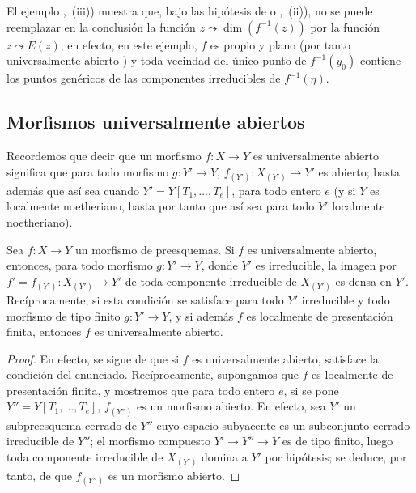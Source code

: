 \begin{remark}[14.2.7]
\label{IV.14.2.7}
El ejemplo ,~(iii)) muestra que, bajo las hipótesis de  o ,~(ii)), no se puede reemplazar en la conclusión la función $z\leadsto\dim(f^{-1}(z))$ por la función $z\leadsto E(z)$; en efecto, en este ejemplo, $f$ es propio y plano (por tanto universalmente abierto ) y toda vecindad del único punto de $f^{-1}(y_0)$ contiene los puntos genéricos de las componentes irreducibles de $f^{-1}(\eta)$.
\end{remark}


\subsection{Morfismos universalmente abiertos}
\label{subsection:IV.14.3}
\label{IV.14.3}

\begin{env}[14.3.1]
\label{IV.14.3.1}
Recordemos  que decir que un morfismo $f:X\to Y$ es universalmente abierto significa que para todo morfismo $g:Y'\to Y$, $f_{(Y')}:X_{(Y')}\to Y'$ es abierto; basta además que así sea cuando $Y'=Y[T_1,\ldots,T_e]$, para todo entero $e$  (y si $Y$ es localmente noetheriano, basta por tanto que así sea para todo $Y'$ localmente noetheriano).
\end{env}

\begin{proposition}[14.3.2]
\label{IV.14.3.2}
Sea $f:X\to Y$ un morfismo de preesquemas.
Si $f$ es universalmente abierto, entonces, para todo morfismo $g:Y'\to Y$, donde $Y'$ es irreducible, la imagen por $f'=f_{(Y')}:X_{(Y')}\to Y'$ de toda componente irreducible de $X_{(Y')}$ es densa en $Y'$.
Recíprocamente, si esta condición se satisface para todo $Y'$ irreducible y todo morfismo de tipo finito $g:Y'\to Y$, y si además $f$ es localmente de presentación finita, entonces $f$ es universalmente abierto.
\end{proposition}

\begin{proof}
En efecto, se sigue de  que si $f$ es universalmente abierto, satisface la condición del enunciado.
Recíprocamente, supongamos que $f$ es localmente de presentación finita, y mostremos que para todo entero $e$, si se pone $Y''=Y[T_1,\ldots,T_e]$, $f_{(Y'')}$ es un morfismo abierto.
En efecto, sea $Y'$ un subpreesquema cerrado de $Y''$ cuyo espacio subyacente es un subconjunto cerrado irreducible de $Y''$; el morfismo compuesto $Y'\to Y''\to Y$ es de tipo finito, luego toda componente irreducible de $X_{(Y')}$ domina a $Y'$ por hipótesis; se deduce, por tanto, de  que $f_{(Y'')}$ es un morfismo abierto.
\end{proof}

